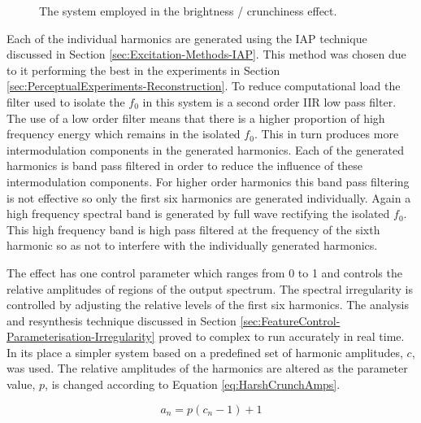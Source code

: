 \begin{figure}[h!]
				\caption{The system employed in the brightness / crunchiness effect.}
				\label{fig:HarshCrunch}
			\end{figure}

			Each of the individual harmonics are generated using the IAP technique discussed in Section
			\ref{sec:Excitation-Methods-IAP}. This method was chosen due to it performing the best in the
			experiments in Section \ref{sec:PerceptualExperiments-Reconstruction}. To reduce computational load
			the filter used to isolate the $f_{0}$ in this system is a second order IIR low pass filter.  The
			use of a low order filter means that there is a higher proportion of high frequency energy which
			remains in the isolated $f_{0}$. This in turn produces more intermodulation components in the
			generated harmonics. Each of the generated harmonics is band pass filtered in order to reduce the
			influence of these intermodulation components. For higher order harmonics this band pass filtering
			is not effective so only the first six harmonics are generated individually. Again a high frequency
			spectral band is generated by full wave rectifying the isolated $f_{0}$. This high frequency band
			is high pass filtered at the frequency of the sixth harmonic so as not to interfere with the
			individually generated harmonics.

			The effect has one control parameter which ranges from 0 to 1 and controls the relative amplitudes
			of regions of the output spectrum. The spectral irregularity is controlled by adjusting the
			relative levels of the first six harmonics. The analysis and resynthesis technique discussed in
			Section \ref{sec:FeatureControl-Parameterisation-Irregularity} proved to complex to run accurately
			in real time. In its place a simpler system based on a predefined set of harmonic amplitudes,
			$c$, was used. The relative amplitudes of the harmonics are altered as the parameter value, $p$,
			is changed according to Equation \ref{eq:HarshCrunchAmps}.

			\begin{equation}
				a_{n} = p(c_{n} - 1) + 1
				\label{eq:HarshCrunchAmps}
			\end{equation}


